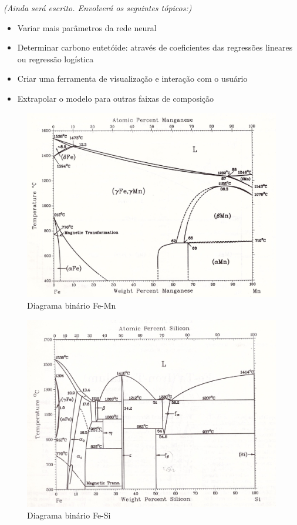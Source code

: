 \documentclass[brazil,tf,epusp]{usp}  %
\begin{document}
\textit{(Ainda será escrito. Envolverá os seguintes tópicos:)}

\begin{itemize}
\item Variar mais parâmetros da rede neural
\item Determinar carbono eutetóide: através de coeficientes das regressões lineares ou regressão logística
\item Criar uma ferramenta de visualização e interação com o usuário
\item Extrapolar o modelo para outras faixas de composição
\end{itemize}





\label{an:diag_bin}

\begin{figure}
  \includegraphics[width=1.1\textwidth]{img/Fe-Mn.jpg}
  \caption{Diagrama binário Fe-Mn}
  \label{fig:bin_fe-mn}
\end{figure}

\begin{figure}
  \includegraphics[width=1.1\textwidth]{img/Fe-Si.jpg}
  \caption{Diagrama binário Fe-Si}
  \label{fig:bin_fe-si}
\end{figure}
\end{document}

